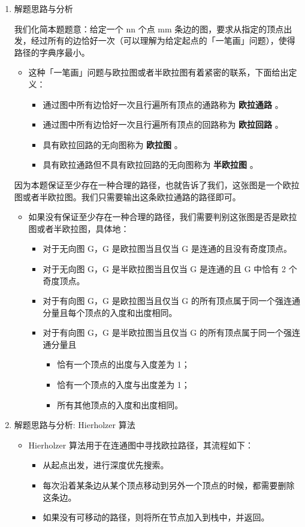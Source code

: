 \documentclass[9pt, b5paaper]{book}
\begin{document}
\begin{enumerate}
\item 解题思路与分析
\label{sec-1-5-2-1}

我们化简本题题意：给定一个 nn 个点 mm 条边的图，要求从指定的顶点出发，经过所有的边恰好一次（可以理解为给定起点的「一笔画」问题），使得路径的字典序最小。

\begin{itemize}
\item 这种「一笔画」问题与欧拉图或者半欧拉图有着紧密的联系，下面给出定义：
\begin{itemize}
\item 通过图中所有边恰好一次且行遍所有顶点的通路称为 \textbf{欧拉通路} 。
\item 通过图中所有边恰好一次且行遍所有顶点的回路称为 \textbf{欧拉回路} 。
\item 具有欧拉回路的无向图称为 \textbf{欧拉图} 。
\item 具有欧拉通路但不具有欧拉回路的无向图称为 \textbf{半欧拉图} 。
\end{itemize}
\end{itemize}

因为本题保证至少存在一种合理的路径，也就告诉了我们，这张图是一个欧拉图或者半欧拉图。我们只需要输出这条欧拉通路的路径即可。

\begin{itemize}
\item 如果没有保证至少存在一种合理的路径，我们需要判别这张图是否是欧拉图或者半欧拉图，具体地：
\begin{itemize}
\item 对于无向图 G，G 是欧拉图当且仅当 G 是连通的且没有奇度顶点。
\item 对于无向图 G，G 是半欧拉图当且仅当 G 是连通的且 G 中恰有 2 个奇度顶点。
\item 对于有向图 G，G 是欧拉图当且仅当 G 的所有顶点属于同一个强连通分量且每个顶点的入度和出度相同。
\item 对于有向图 G，G 是半欧拉图当且仅当 G 的所有顶点属于同一个强连通分量且
\begin{itemize}
\item 恰有一个顶点的出度与入度差为 1；
\item 恰有一个顶点的入度与出度差为 1；
\item 所有其他顶点的入度和出度相同。
\end{itemize}
\end{itemize}
\end{itemize}
\item 解题思路与分析: Hierholzer 算法
\label{sec-1-5-2-2}
\begin{itemize}
\item Hierholzer 算法用于在连通图中寻找欧拉路径，其流程如下：
\begin{itemize}
\item 从起点出发，进行深度优先搜索。
\item 每次沿着某条边从某个顶点移动到另外一个顶点的时候，都需要删除这条边。
\item 如果没有可移动的路径，则将所在节点加入到栈中，并返回。
\end{itemize}
\end{itemize}


\end{enumerate}
\end{document}

